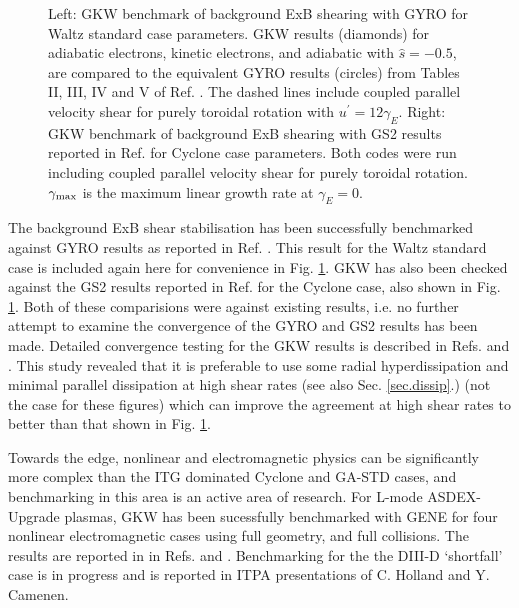 \begin{figure}[htb] 
\begin{center}
\caption{Left: GKW benchmark of background ExB shearing with GYRO for Waltz standard case parameters. GKW results (diamonds) for
 adiabatic electrons, kinetic electrons, and adiabatic with $\hat s = -0.5$, are compared to the equivalent GYRO results (circles) from Tables II, III, IV and V  of Ref. \cite{KIN05}. The dashed lines include coupled
parallel velocity shear for purely toroidal rotation with $u^\prime=12\gamma_E$.  Right: GKW benchmark of background ExB shearing with GS2 results reported in Ref. \cite{ROA09} for Cyclone case parameters.  Both codes were run including coupled parallel velocity shear for purely toroidal rotation.  $\gamma_{\rm max}$ is the maximum linear growth rate at $\gamma_E=0$.}
\label{exb-gyro} 
\end{center}
\end{figure} 

The background ExB shear stabilisation 
has been successfully benchmarked against GYRO results as reported in Ref. \cite{CAS09}.  This result for the Waltz standard case 
is included again here for convenience in Fig. \ref{exb-gyro}.  GKW has also been checked against 
the GS2 results reported in Ref. \cite{ROA09} for the Cyclone case, also shown in Fig. \ref{exb-gyro}.  Both of these comparisions were against existing results, i.e. no further attempt to examine the convergence of the GYRO and GS2 results has been made.  Detailed convergence testing for the GKW results is described in Refs. \cite{Casson-Thesis} and \cite{exb-dissip}.  This study revealed that it is preferable to use some radial hyperdissipation and minimal parallel dissipation at high shear rates (see also Sec. \ref{sec.dissip}.) (not the case for these figures) which can improve the agreement at high shear rates to better than that shown in Fig. \ref{exb-gyro}.

Towards the edge, nonlinear and electromagnetic physics can be significantly more complex than
the ITG dominated Cyclone and GA-STD cases,
and benchmarking in this area is an active area of research.  
For L-mode ASDEX-Upgrade plasmas, GKW has been sucessfully benchmarked with GENE 
for four nonlinear electromagnetic cases using full geometry, and full collisions.  The results 
are reported in in Refs. \cite{FAB13} and \cite{TOL13}.  
Benchmarking for the the DIII-D `shortfall' case is in progress and 
is reported in ITPA presentations of C. Holland and Y. Camenen.

